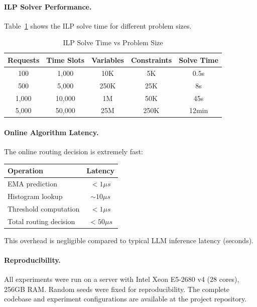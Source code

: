 \paragraph{ILP Solver Performance.}
Table~\ref{tab:ilp_runtime} shows the ILP solve time for different problem sizes.

\begin{table}[h]
\caption{ILP Solve Time vs Problem Size}
\label{tab:ilp_runtime}
\begin{center}
\begin{tabular}{ccccc}
\toprule
Requests & Time Slots & Variables & Constraints & Solve Time \\
\midrule
100 & 1,000 & 10K & 5K & 0.5s \\
500 & 5,000 & 250K & 25K & 8s \\
1,000 & 10,000 & 1M & 50K & 45s \\
5,000 & 50,000 & 25M & 250K & 12min \\
\bottomrule
\end{tabular}
\end{center}
\end{table}

\paragraph{Online Algorithm Latency.}
The online routing decision is extremely fast:
\begin{center}
\begin{tabular}{lc}
\toprule
Operation & Latency \\
\midrule
EMA prediction & $< 1\mu s$ \\
Histogram lookup & $\sim 10\mu s$ \\
Threshold computation & $< 1\mu s$ \\
Total routing decision & $< 50\mu s$ \\
\bottomrule
\end{tabular}
\end{center}

This overhead is negligible compared to typical LLM inference latency (seconds).

\paragraph{Reproducibility.}
All experiments were run on a server with Intel Xeon E5-2680 v4 (28 cores), 256GB RAM. Random seeds were fixed for reproducibility. The complete codebase and experiment configurations are available at the project repository.

